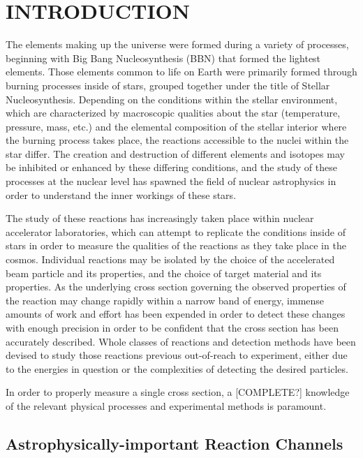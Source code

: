 \chapter{INTRODUCTION}

The elements making up the universe were formed during a variety of processes,
beginning with Big Bang Nucleosynthesis (BBN) that formed the lightest
elements. Those elements common to life on Earth were primarily formed through
burning processes inside of stars, grouped together under the title of
Stellar Nucleosynthesis. Depending on the conditions within the stellar
environment, which are characterized by macroscopic qualities about the star
(temperature, pressure, mass, etc.) and the elemental composition of the
stellar interior where the burning process takes place, the reactions
accessible to the nuclei within the star differ. The creation and destruction
of different elements and isotopes may be inhibited or enhanced by these
differing conditions, and the study of these processes at the nuclear level
has spawned the field of nuclear astrophysics in order to understand the inner
workings of these stars.

The study of these reactions has increasingly taken place within nuclear
accelerator laboratories, which can attempt to replicate the conditions inside
of stars in order to measure the qualities of the reactions as they take place
in the cosmos. Individual reactions may be isolated by the choice of the
accelerated beam particle and its properties, and the choice of target material
and its properties. As the underlying cross section governing the observed
properties of the reaction may change rapidly within a narrow band of energy,
immense amounts of work and effort has been expended in order to detect these
changes with enough precision in order to be confident that the cross section
has been accurately described. Whole classes of reactions and detection methods
have been devised to study those reactions previous out-of-reach to experiment,
either due to the energies in question or the complexities of detecting the
desired particles.

In order to properly measure a single cross section, a [COMPLETE?] knowledge of
the relevant physical processes and experimental methods is paramount.



\section{Astrophysically-important Reaction Channels}

